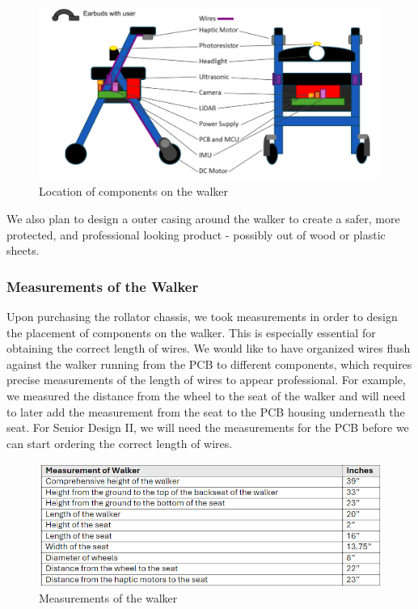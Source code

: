 \begin{figure}[H]
	\centering
	\includegraphics[width=1\textwidth]{./Images/component_location_ear.png}
	\caption{\label{fig:Component-Locations}Location of components on the walker}
\end{figure}


\noindent We also plan to design a outer casing around the walker to create a safer, more protected, and professional looking product - possibly out of wood or plastic sheets. \\

\subsubsection{Measurements of the Walker}
\noindent Upon purchasing the rollator chassis, we took measurements in order to design the placement of components on the walker. This is especially essential for obtaining the correct length of wires. We would like to have organized wires flush against the walker running from the PCB to different components, which requires precise measurements of the length of wires to appear professional. For example, we measured the distance from the wheel to the seat of the walker and will need to later add the measurement from the seat to the PCB housing underneath the seat. For Senior Design II, we will need the measurements for the PCB before we can start ordering the correct length of wires.\\

\begin{figure}[H]
	\centering
	\includegraphics[width=1\textwidth]{./Images/measurements.png}
	\caption{\label{fig:Measurements_of_walker}Measurements of the walker}
\end{figure}